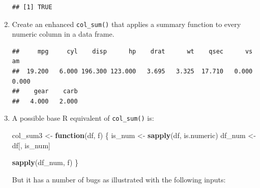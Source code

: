 \documentclass[]{book}
\newenvironment{Shaded}{\begin{snugshade}}{\end{snugshade}}
\newcommand{\CommentTok}[1]{\textcolor[rgb]{0.56,0.35,0.01}{\textit{#1}}}
\newcommand{\ControlFlowTok}[1]{\textcolor[rgb]{0.13,0.29,0.53}{\textbf{#1}}}
\newcommand{\KeywordTok}[1]{\textcolor[rgb]{0.13,0.29,0.53}{\textbf{#1}}}
\newcommand{\NormalTok}[1]{#1}
\newcommand{\OperatorTok}[1]{\textcolor[rgb]{0.81,0.36,0.00}{\textbf{#1}}}
\newcommand{\StringTok}[1]{\textcolor[rgb]{0.31,0.60,0.02}{#1}}
\theoremstyle{definition}
\theoremstyle{definition}
\theoremstyle{definition}
\theoremstyle{remark}
\begin{document}
\begin{enumerate}
\begin{verbatim}
## [1] TRUE
\end{verbatim}

\begin{Shaded}
\end{Shaded}
\item
  Create an enhanced \texttt{col\_sum()} that applies a summary function
  to every numeric column in a data frame.

\begin{Shaded}
\end{Shaded}

\begin{verbatim}
##     mpg     cyl    disp      hp    drat      wt    qsec      vs      am 
##  19.200   6.000 196.300 123.000   3.695   3.325  17.710   0.000   0.000 
##    gear    carb 
##   4.000   2.000
\end{verbatim}
\item
  A possible base R equivalent of \texttt{col\_sum()} is:

\begin{Shaded}
\begin{Highlighting}[]
\NormalTok{col_sum3 <-}\StringTok{ }\ControlFlowTok{function}\NormalTok{(df, f) \{}
\NormalTok{  is_num <-}\StringTok{ }\KeywordTok{sapply}\NormalTok{(df, is.numeric)}
\NormalTok{  df_num <-}\StringTok{ }\NormalTok{df[, is_num]}

  \KeywordTok{sapply}\NormalTok{(df_num, f)}
\NormalTok{\}}
\end{Highlighting}
\end{Shaded}

  But it has a number of bugs as illustrated with the following inputs:


\end{enumerate}
\end{document}
